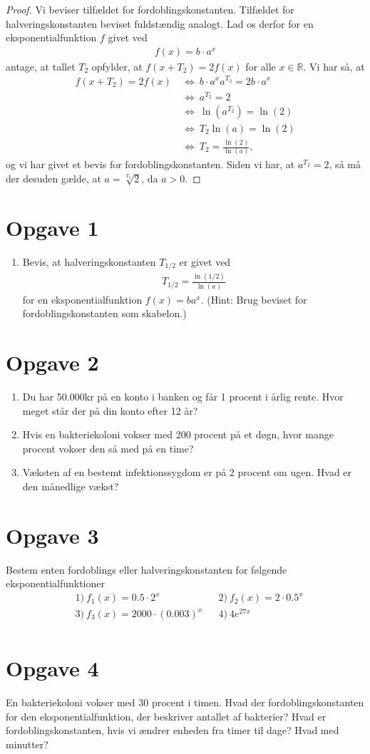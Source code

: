 \begin{proof}
Vi beviser tilfældet for fordoblingskonstanten. Tilfældet for halveringskonstanten beviset fuldstændig analogt. Lad os derfor for en eksponentialfunktion $f$ givet ved
\begin{align*}
f(x) = b\cdot a^x
\end{align*}
antage, at tallet $T_2$ opfylder, at $f(x+T_2) = 2f(x)$ for alle $x\in \mathbb{R}$. Vi har så, at 
\begin{align*}
f(x+T_2) = 2f(x) \ &\Leftrightarrow \ b\cdot a^{x}a^{T_2}=2b\cdot a^x\\
&\Leftrightarrow\ a^{T_2} = 2\\
&\Leftrightarrow\ \ln(a^{T_2}) = \ln(2)\\
&\Leftrightarrow\ T_2\ln(a) = \ln(2)\\
&\Leftrightarrow\ T_2 = \frac{\ln(2)}{\ln(a)},
\end{align*}
og vi har givet et bevis for fordoblingskonstanten. Siden vi har, at $a^{T_2} = 2$, så må der desuden gælde, at $a=\sqrt[T_2]{2}$, da $a>0$. 
\end{proof}
\section*{Opgave 1}
\begin{enumerate}[label=\roman*)]
\item Bevis, at halveringskonstanten $T_{1/2}$ er givet ved 
\begin{align*}
T_{1/2} = \frac{\ln(1/2)}{\ln(a)}
\end{align*}
for en eksponentialfunktion $f(x) = ba^x$. (Hint: Brug beviset for fordoblingskonstanten som skabelon.)
\end{enumerate}
\section*{Opgave 2}
\begin{enumerate}[label=\roman*)]
\item Du har 50.000kr på en konto i banken og får 1 procent i årlig rente. Hvor meget står der på din konto efter 12 år?
\item Hvis en bakteriekoloni vokser med 200 procent på et døgn, hvor mange procent vokser den så med på en time?
\item Væksten af en bestemt infektionssygdom er på 2 procent om ugen. Hvad er den månedlige vækst?
\end{enumerate}
\section*{Opgave 3}
Bestem enten fordoblings eller halveringskonstanten for følgende eksponentialfunktioner
\begin{align*}
&1) \ f_1(x) = 0.5\cdot 2^x   &&2) \ f_2(x)=2\cdot 0.5^x  \\
&3) \ f_3(x) = 2000\cdot(0.003)^x  &&4) \ 4e^{27x}  \\
\end{align*}
\section*{Opgave 4}
En bakteriekoloni vokser med $30$ procent i timen. Hvad der fordoblingskonstanten for den eksponentialfunktion, der beskriver antallet af bakterier? Hvad er fordoblingskonstanten, hvis vi ændrer enheden fra timer til dage? Hvad med minutter?